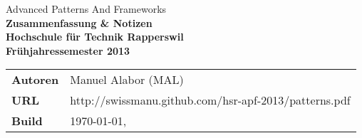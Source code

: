 \begin{titlepage}

	\thispagestyle{empty}
	\BgThispage

	\sffamily\color{titlepagefontcolor}
	\begin{center}
		\Large
		Advanced Patterns And Frameworks\\[5mm]
	   
		\Huge\bfseries
		Zusammenfassung \& Notizen\\[15mm]

		\large\normalfont\sffamily
		Hochschule für Technik Rapperswil\\[1mm]
		Frühjahressemester 2013
	\end{center}
	\vfill

	\begin{multicols}{2}
		\begin{tabularx}{\textwidth}{l X}
			\bfseries Autoren & Manuel Alabor (MAL)\tabularnewline
			\bfseries URL & http://swissmanu.github.com/hsr-apf-2013/patterns.pdf\tabularnewline
			\bfseries Build & \today, \currenttime\tabularnewline
		\end{tabularx}
		
	\end{multicols}

\end{titlepage}

\restoregeometry